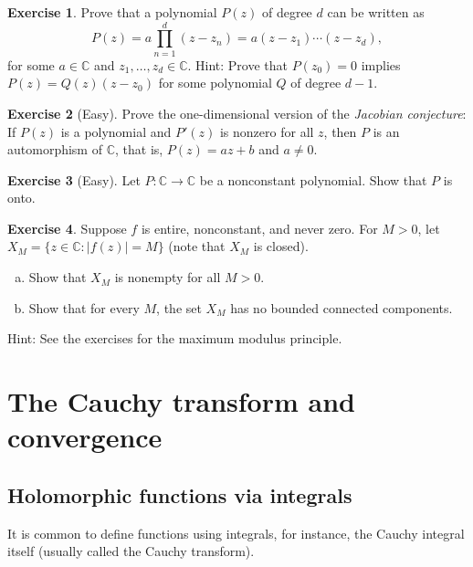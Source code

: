 \documentclass[12pt,openany]{book}
\newcommand{\sabs}[1]{\lvert {#1} \rvert}
\newcommand{\C}{{\mathbb{C}}}
\newcommand{\myindex}[1]{#1\index{#1}}
\theoremstyle{plain}
\theoremstyle{remark}
\theoremstyle{definition}
\newenvironment{exbox}{%
    \def\FrameCommand{\vrule width 1pt \relax\hspace{10pt}}%
    \MakeFramed{\advance\hsize-\width\FrameRestore}%
}{%
    \endMakeFramed
}
\newenvironment{exparts}{%
    \leavevmode\begin{enumerate}[a),noitemsep,topsep=0pt,parsep=0pt,partopsep=0pt]
}{%
    \end{enumerate}
}
\theoremstyle{exercise}
\newtheorem{exercise}{Exercise}[section]
\theoremstyle{example}
\begin{document}
\begin{exbox}
\begin{exercise}
Prove that a polynomial $P(z)$ of degree $d$ can be written as
\begin{equation*}
P(z) = a \prod_{n=1}^d (z-z_n) = a (z-z_1) \cdots (z-z_d),
\end{equation*}
for some $a \in \C$ and $z_1,\ldots,z_d \in \C$.
Hint: Prove that $P(z_0) = 0$ implies $P(z) = Q(z) (z-z_0)$ for some
polynomial $Q$ of degree $d-1$.
\end{exercise}

\begin{exercise}[Easy]
Prove the one-dimensional version of the \emph{\myindex{Jacobian conjecture}}:
If $P(z)$ is a polynomial and $P'(z)$ is nonzero for all $z$,
then $P$ is an automorphism of $\C$, that is, $P(z) = az+b$ and $a \neq 0$.
\end{exercise}

\begin{exercise}[Easy]
Let $P \colon \C \to \C$ be a nonconstant polynomial.  Show that $P$ is
onto.
\end{exercise}

\begin{exercise}
Suppose $f$ is entire, nonconstant, and never zero.  For $M > 0$, let
$X_M = \bigl\{ z \in \C : \sabs{f(z)} = M \bigr\}$ (note that $X_M$
is closed).
\begin{exparts}
\item Show that $X_M$ is nonempty for all $M > 0$.
\item Show that for every $M$, the set $X_M$ has no bounded connected components.
\end{exparts}
Hint: See the exercises for the maximum modulus principle.
\end{exercise}
\end{exbox}


\section{The Cauchy transform and convergence}

\subsection{Holomorphic functions via integrals}

It is common to define functions using integrals, for instance,
the Cauchy integral itself (usually called the Cauchy transform).
\end{document}
